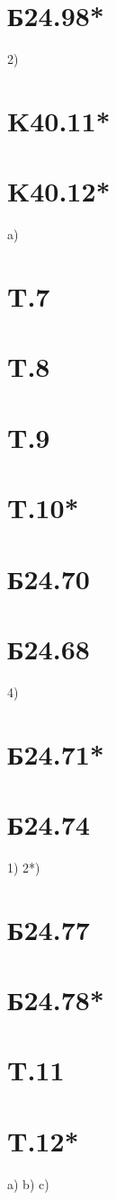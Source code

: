 \section*{Б24.98*}2)
\section*{K40.11*}
\section*{K40.12*}a)
\section*{T.7}
\section*{T.8}
\section*{T.9}
\section*{T.10*}
\section*{Б24.70}
\section*{Б24.68}4)
\section*{Б24.71*}
\section*{Б24.74}
1)
2*)
\section*{Б24.77}
\section*{Б24.78*}
\section*{T.11}
\section*{T.12*}
a)
b)
c)
